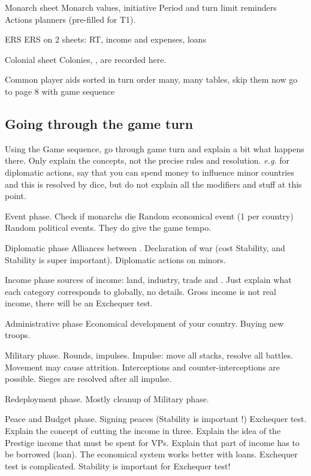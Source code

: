 \aparag Monarch sheet
\bparag Monarch values, initiative
\bparag Period and turn limit reminders
\bparag Actions planners (pre-filled for T1).

\aparag ERS
 ERS on 2 sheets: RT, income and expenses, loans

\aparag Colonial sheet
\bparag Colonies, \TP, \TradeFleet are recorded here.

\aparag Common player aids
\bparag sorted in turn order
\bparag many, many tables, skip them now
\bparag go to page 8 with game sequence

\subsection{Going through the game turn}
\aparag Using the Game sequence, go through game turn and explain a bit what
happens there.
\bparag Only explain the concepts, not the precise rules and resolution.
\bparag \emph{e.g.} for diplomatic actions, say that you can spend money to
influence minor countries and this is resolved by dice, but do not explain all
the modifiers and stuff at this point.

\aparag Event phase.
\bparag Check if monarchs die
\bparag Random economical event (1 per country)
\bparag Random political events. They do give the game tempo.

\aparag Diplomatic phase
\bparag Alliances between \MAJ.
\bparag Declaration of war (cost Stability, and Stability is super important).
\bparag Diplomatic actions on minors.

\aparag Income phase
 sources of income: land, industry, trade and \ROTW.
\bparag Just explain what each category corresponds to globally, no details.
\bparag Gross income is not real income, there will be an Exchequer test.

\aparag Administrative phase
\bparag Economical development of your country.
\bparag Buying new troops.

\aparag Military phase.
\bparag Rounds, impulses.
\bparag Impulse: move all stacks, resolve all battles.
\bparag Movement may cause attrition.
\bparag Interceptions and counter-interceptions are possible.
\bparag Sieges are resolved after all impulse.

\aparag Redeployment phase.
\bparag Mostly cleanup of Military phase.

\aparag Peace and Budget phase.
\bparag Signing peaces (Stability is important !)
\bparag Exchequer test.
\bparag Explain the concept of cutting the income in three.
\bparag Explain the idea of the Prestige income that must be spent for VPs.
\bparag Explain that part of income has to be borrowed (loan).
\bparag The economical system works better with loans.
\bparag Exchequer test is complicated.
\bparag Stability is important for Exchequer test!

